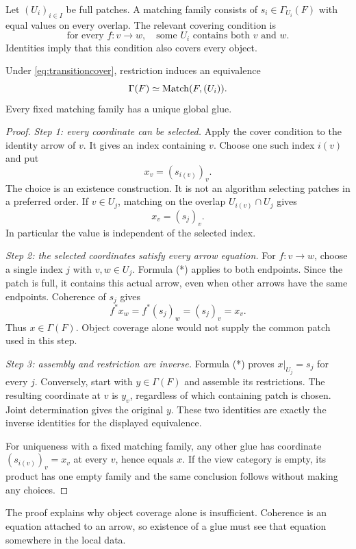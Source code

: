 Let \((U_i)_{i\in I}\) be full patches. A matching family consists of \(s_i\in\Gamma_{U_i}(F)\) with equal values on every overlap. The relevant covering condition is
\begin{equation}\label{eq:transitioncover}
 \text{for every }f:v\to w,\quad
 \text{some }U_i\text{ contains both }v\text{ and }w.
\end{equation}
Identities imply that this condition also covers every object.

\begin{theorem}\label{KS04}
Under \eqref{eq:transitioncover}, restriction induces an equivalence
\[
 \Gamma(F)\simeq\operatorname{Match}(F,(U_i)).
\]
Every fixed matching family has a unique global glue.
\end{theorem}
\begin{proof}
\emph{Step 1: every coordinate can be selected.} Apply the cover condition to the identity arrow of $v$. It gives an index containing $v$. Choose one such index $i(v)$ and put
\[
 x_v=(s_{i(v)})_v.
\]
The choice is an existence construction. It is not an algorithm selecting patches in a preferred order. If $v\in U_j$, matching on the overlap $U_{i(v)}\cap U_j$ gives
\[
 x_v=(s_j)_v.                                                   \tag{*}
\]
In particular the value is independent of the selected index.

\emph{Step 2: the selected coordinates satisfy every arrow equation.} For $f:v\to w$, choose a single index $j$ with $v,w\in U_j$. Formula (*) applies to both endpoints. Since the patch is full, it contains this actual arrow, even when other arrows have the same endpoints. Coherence of $s_j$ gives
\[
 f^*x_w=f^*(s_j)_w=(s_j)_v=x_v.
\]
Thus $x\in\Gamma(F)$. Object coverage alone would not supply the common patch used in this step.

\emph{Step 3: assembly and restriction are inverse.} Formula (*) proves $x|_{U_j}=s_j$ for every $j$. Conversely, start with $y\in\Gamma(F)$ and assemble its restrictions. The resulting coordinate at $v$ is $y_v$, regardless of which containing patch is chosen. Joint determination gives the original $y$. These two identities are exactly the inverse identities for the displayed equivalence.

For uniqueness with a fixed matching family, any other glue has coordinate $(s_{i(v)})_v=x_v$ at every $v$, hence equals $x$. If the view category is empty, its product has one empty family and the same conclusion follows without making any choices.
\end{proof}
The proof explains why object coverage alone is insufficient. Coherence is an equation attached to an arrow, so existence of a glue must see that equation somewhere in the local data.

